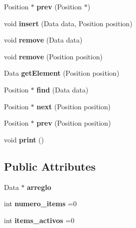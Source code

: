 \begin{DoxyCompactItemize}
Position $\ast$ {\bfseries prev} (Position $\ast$)
\item 
\mbox{\label{class_array_list_a31a793ebb8ab9f2ab4e58cc5bf9c4f15}} 
void {\bfseries insert} (Data data, Position position)
\item 
\mbox{\label{class_array_list_af2c5f1d24667ea4ab4db08ecfc5d8e5e}} 
void {\bfseries remove} (Data data)
\item 
\mbox{\label{class_array_list_a91f056a60914263b1d5c97cb2c8b0b35}} 
void {\bfseries remove} (Position position)
\item 
\mbox{\label{class_array_list_a6a77f7f12b978b7ecd2811e00498ef8f}} 
Data {\bfseries get\+Element} (Position position)
\item 
\mbox{\label{class_array_list_aa6f8a6339fed33d585a1890f9f1254e7}} 
Position $\ast$ {\bfseries find} (Data data)
\item 
\mbox{\label{class_array_list_a4971334b33640242e64f5e8940b96052}} 
Position $\ast$ {\bfseries next} (Position position)
\item 
\mbox{\label{class_array_list_a6efdfdc5cf1bde019938682b83bc0e26}} 
Position $\ast$ {\bfseries prev} (Position position)
\item 
\mbox{\label{class_array_list_aa1e6bad9eec99411e04abb8ca52e9f58}} 
void {\bfseries print} ()
\end{DoxyCompactItemize}
\subsection*{Public Attributes}
\begin{DoxyCompactItemize}
\item 
\mbox{\label{class_array_list_aad082c0109880cc13258b44f782519b2}} 
Data $\ast$ {\bfseries arreglo}
\item 
\mbox{\label{class_array_list_adcead6da2aaf9a0df26b8a9ced623c0a}} 
int {\bfseries numero\+\_\+items} =0
\item 
\mbox{\label{class_array_list_acc408eae4e59773579790c20d92762e0}} 
int {\bfseries items\+\_\+activos} =0
\end{DoxyCompactItemize}



